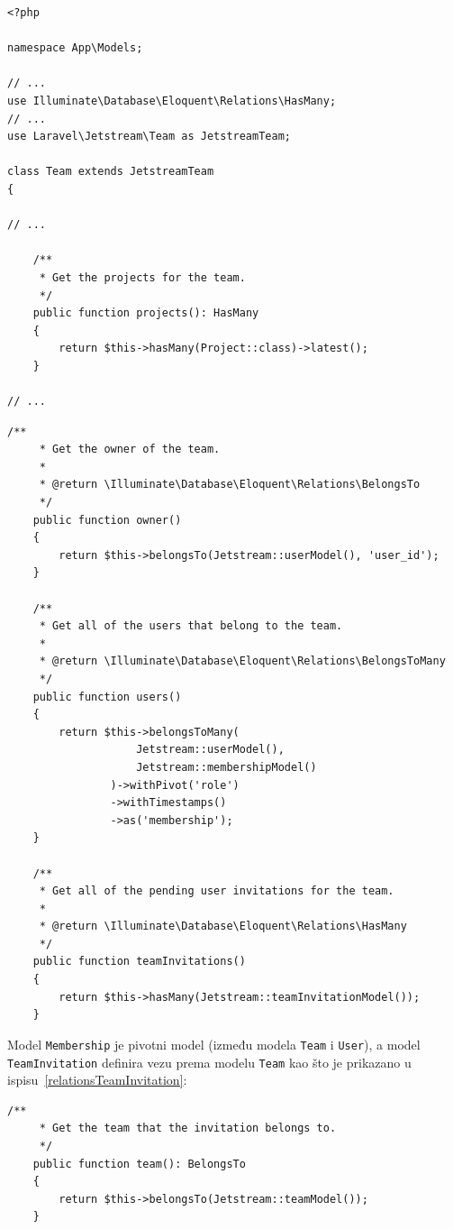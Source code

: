 \begin{lstlisting}[caption={Relacije modela \texttt{Team}}, label=relationsTeam]
<?php

namespace App\Models;

// ...
use Illuminate\Database\Eloquent\Relations\HasMany;
// ...
use Laravel\Jetstream\Team as JetstreamTeam;

class Team extends JetstreamTeam
{

// ...

    /**
     * Get the projects for the team.
     */
    public function projects(): HasMany
    {
        return $this->hasMany(Project::class)->latest();
    }
    
// ...
\end{lstlisting}

\begin{lstlisting}[caption={Relacije modela \texttt{Team} koje nasljeđuje od modela \texttt{JetstreamTeam}}, label=relationsJetstreamTeam]
    /**
     * Get the owner of the team.
     *
     * @return \Illuminate\Database\Eloquent\Relations\BelongsTo
     */
    public function owner()
    {
        return $this->belongsTo(Jetstream::userModel(), 'user_id');
    }
    
    /**
     * Get all of the users that belong to the team.
     *
     * @return \Illuminate\Database\Eloquent\Relations\BelongsToMany
     */
    public function users()
    {
        return $this->belongsToMany(
                    Jetstream::userModel(), 
                    Jetstream::membershipModel()
                )->withPivot('role')
                ->withTimestamps()
                ->as('membership');
    }
    
    /**
     * Get all of the pending user invitations for the team.
     *
     * @return \Illuminate\Database\Eloquent\Relations\HasMany
     */
    public function teamInvitations()
    {
        return $this->hasMany(Jetstream::teamInvitationModel());
    }
\end{lstlisting}

Model \texttt{Membership} je pivotni model (između modela \texttt{Team} i \texttt{User}), a model \\ \texttt{TeamInvitation} definira vezu prema modelu \texttt{Team} kao što je prikazano u ispisu~\ref{relationsTeamInvitation}:

\begin{lstlisting}[caption={Relacije modela \texttt{TeamInvitation}}, label=relationsTeamInvitation]
    /**
     * Get the team that the invitation belongs to.
     */
    public function team(): BelongsTo
    {
        return $this->belongsTo(Jetstream::teamModel());
    }
\end{lstlisting}

